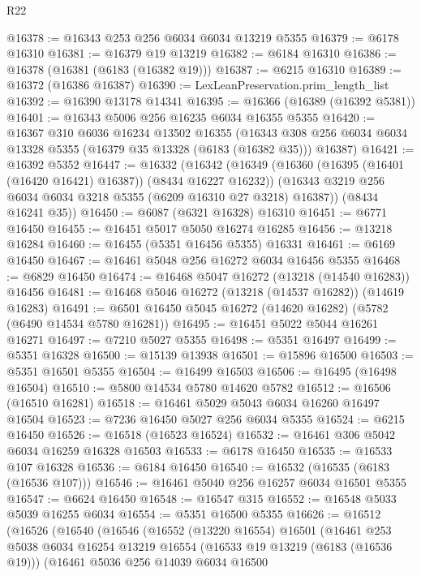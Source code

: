 \begin{lexlean}{R22}
\begin{coremodule}
@16378 := @16343 @253 @256 @6034 @6034 @13219 @5355
@16379 := @6178 @16310
@16381 := @16379 @19 @13219
@16382 := @6184 @16310
@16386 := @16378 (@16381 (@6183 (@16382 @19)))
@16387 := @6215 @16310
@16389 := @16372 (@16386 @16387)
@16390 := LexLeanPreservation.prim_length_list
@16392 := @16390 @13178 @14341
@16395 := @16366 (@16389 (@16392 @5381))
@16401 := @16343 @5006 @256 @16235 @6034 @16355 @5355
@16420 := @16367
    @310
    @6036
    @16234
    @13502
    @16355
    (@16343 @308 @256 @6034 @6034 @13328 @5355 (@16379 @35 @13328 (@6183 (@16382 @35))) @16387)
@16421 := @16392 @5352
@16447 := @16332
    (@16342
      (@16349
        (@16360 (@16395 (@16401 (@16420 @16421) @16387)) (@8434 @16227 @16232))
        (@16343 @3219 @256 @6034 @6034 @3218 @5355 (@6209 @16310 @27 @3218) @16387))
      (@8434 @16241 @35))
@16450 := @6087 (@6321 @16328) @16310
@16451 := @6771 @16450
@16455 := @16451 @5017 @5050 @16274 @16285
@16456 := @13218 @16284
@16460 := @16455 (@5351 @16456 @5355) @16331
@16461 := @6169 @16450
@16467 := @16461 @5048 @256 @16272 @6034 @16456 @5355
@16468 := @6829 @16450
@16474 := @16468 @5047 @16272 (@13218 (@14540 @16283)) @16456
@16481 := @16468 @5046 @16272 (@13218 (@14537 @16282)) (@14619 @16283)
@16491 := @6501 @16450 @5045 @16272 (@14620 @16282) (@5782 (@6490 @14534 @5780 @16281))
@16495 := @16451 @5022 @5044 @16261 @16271
@16497 := @7210 @5027 @5355
@16498 := @5351 @16497
@16499 := @5351 @16328
@16500 := @15139 @13938
@16501 := @15896 @16500
@16503 := @5351 @16501 @5355
@16504 := @16499 @16503
@16506 := @16495 (@16498 @16504)
@16510 := @5800 @14534 @5780 @14620 @5782
@16512 := @16506 (@16510 @16281)
@16518 := @16461 @5029 @5043 @6034 @16260 @16497 @16504
@16523 := @7236 @16450 @5027 @256 @6034 @5355
@16524 := @6215 @16450
@16526 := @16518 (@16523 @16524)
@16532 := @16461 @306 @5042 @6034 @16259 @16328 @16503
@16533 := @6178 @16450
@16535 := @16533 @107 @16328
@16536 := @6184 @16450
@16540 := @16532 (@16535 (@6183 (@16536 @107)))
@16546 := @16461 @5040 @256 @16257 @6034 @16501 @5355
@16547 := @6624 @16450
@16548 := @16547 @315
@16552 := @16548 @5033 @5039 @16255 @6034
@16554 := @5351 @16500 @5355
@16626 := @16512
    (@16526
      (@16540
        (@16546
          (@16552
            (@13220 @16554)
            @16501
            (@16461
              @253
              @5038
              @6034
              @16254
              @13219
              @16554
              (@16533 @19 @13219 (@6183 (@16536 @19)))
              (@16461
                @5036
                @256
                @14039
                @6034
                @16500

\end{coremodule}
\end{lexlean}
